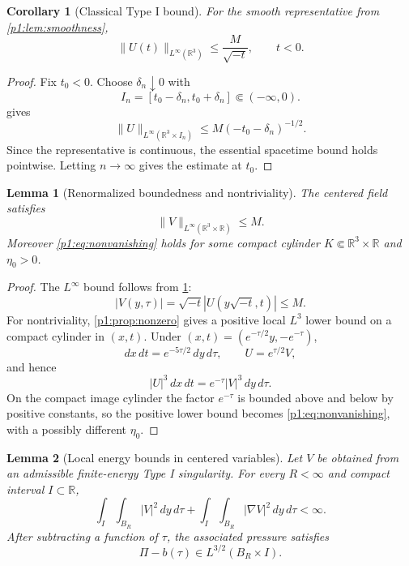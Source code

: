 \documentclass[11pt]{amsart}
\theoremstyle{plain}
\newtheorem{lemma}[lemma]{Lemma}
\newtheorem{corollary}[corollary]{Corollary}
\theoremstyle{definition}
\theoremstyle{remark}
\numberwithin{equation}{section}
\newcommand{\R}{\mathbb R}
\begin{document}
\begin{corollary}[Classical Type I bound]\label{p1:cor:classical-type-I-bound}
For the smooth representative from \cref{p1:lem:smoothness},
\[
   \|U(t)\|_{L^\infty(\R^3)}\le \frac{M}{\sqrt{-t}},
   \qquad t<0.
\]
\end{corollary}

\begin{proof}
Fix \(t_0<0\).  Choose \(\delta_n\downarrow0\) with
\[
   I_n=[t_0-\delta_n,t_0+\delta_n]\Subset(-\infty,0).
\]
 gives
\[
   \|U\|_{L^\infty(\R^3\times I_n)}
   \le M(-t_0-\delta_n)^{-1/2}.
\]
Since the representative is continuous, the essential spacetime bound holds
pointwise.  Letting \(n\to\infty\) gives the estimate at \(t_0\).
\end{proof}

\begin{lemma}[Renormalized boundedness and nontriviality]
\label{p1:lem:renorm-bounds}
The centered field satisfies
\[
   \|V\|_{L^\infty(\R^3\times\R)}\le M.
\]
Moreover \eqref{p1:eq:nonvanishing} holds for some compact cylinder
\(K\Subset\R^3\times\R\) and \(\eta_0>0\).
\end{lemma}

\begin{proof}
The \(L^\infty\) bound follows from \cref{p1:cor:classical-type-I-bound}:
\[
   |V(y,\tau)|=\sqrt{-t}|U(y\sqrt{-t},t)|\le M.
\]
For nontriviality, \cref{p1:prop:nonzero} gives a positive local \(L^3\) lower bound
on a compact cylinder in \((x,t)\).  Under
\((x,t)=(e^{-\tau/2}y,-e^{-\tau})\),
\[
   dx\,dt=e^{-5\tau/2}\,dy\,d\tau,\qquad
   U=e^{\tau/2}V,
\]
and hence
\[
   |U|^3\,dx\,dt=e^{-\tau}|V|^3\,dy\,d\tau .
\]
On the compact image cylinder the factor \(e^{-\tau}\) is bounded above and
below by positive constants, so the positive lower bound becomes
\eqref{p1:eq:nonvanishing}, with a possibly different \(\eta_0\).
\end{proof}

\begin{lemma}[Local energy bounds in centered variables]
\label{p1:lem:centered-local-energy}
Let \(V\) be obtained from an admissible finite-energy Type I singularity.  For every
\(R<\infty\) and
compact interval \(I\subset\R\),
\[
   \int_I\int_{B_R}|V|^2\,dy\,d\tau
   +
   \int_I\int_{B_R}|\nabla V|^2\,dy\,d\tau<\infty .
\]
After subtracting a function of \(\tau\), the associated pressure satisfies
\[
   \Pi-b(\tau)\in L^{3/2}(B_R\times I).
\]
\end{lemma}
\end{document}
